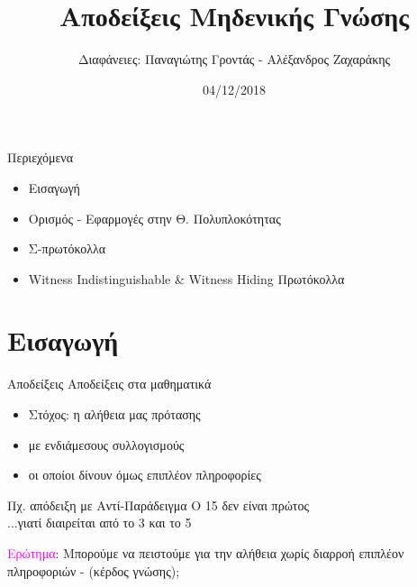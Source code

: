 \documentclass[10pt,handout]{beamer}
\title{Αποδείξεις Μηδενικής Γνώσης}
\author{Διαφάνειες: Παναγιώτης Γροντάς - Αλέξανδρος Ζαχαράκης}
\date{04/12/2018}
\institute{ΕΜΠ - Κρυπτογραφία (2018-2019)}
\begin{document}
\newcommand{\xor}{ \oplus }
\newcommand{\msg}{ \mathtt{M} }
\newcommand{\KEY}{ \mathtt{K} }
\newcommand{\CPH}{ \mathtt{C} }
\newcommand{\keygen}{\mathtt{KeyGen}}
\newcommand{\enc}{\mathtt{Encrypt}}
\newcommand{\dec}{\mathtt{Decrypt}}
\newcommand{\sign}{\mathtt{Sign}}
\newcommand{\verify}{\mathtt{Verify}}
\newcommand{\adv}{$\mathcal{A}$}
\newcommand{\Hash}{\mathcal{H} }
\newcommand{\advb}{$\mathcal{B}$}
\newcommand{\chal}{$\mathcal{C}$}
\newcommand{\cs}{$\mathcal{CS}$}
\newcommand{\Zed}{\mathbb{Z}} 
\newcommand{\zns}{\mathbb{Z}^*_n}
\newcommand{\zs}[1]{\mathbb{Z}^*_{#1}}
\newcommand{\prv}{\ensuremath \mathcal{P}\,}
\newcommand{\ver}{\ensuremath \mathcal{V}\,}
\newcommand{\siml}{$\mathcal{S}\,$}
\newcommand{\green}[1]{\textcolor{teal}{#1}}
\newcommand{\Green}[1]{\textcolor{Teal}{#1}}
\newcommand{\ForestGreen}[1]{\textcolor{ForestGreen}{#1}}
\newcommand{\blue}[1]{\textcolor{blue}{#1}}
\newcommand{\magenta}[1]{\textcolor{magenta}{#1}}
\newcommand{\cyan}[1]{\textcolor{cyan}{#1}}

\newcommand{\twopartdef}[4]
{ 
		\begin{cases}
			#1 , #2 \\
			#3 , #4
		\end{cases} 
}
\begin{frame}
\titlepage
\end{frame}

\begin{frame}{Περιεχόμενα}
\begin{itemize}
\item Εισαγωγή
\item Ορισμός - Εφαρμογές στην Θ. Πολυπλοκότητας
\item Σ-πρωτόκολλα
\item Witness Indistinguishable \& Witness Hiding Πρωτόκολλα
\end{itemize}
\end{frame}

\section{Εισαγωγή}
\begin{frame}{Αποδείξεις}
Αποδείξεις στα μαθηματικά
\pause
\begin{itemize}
\item Στόχος: η αλήθεια μας πρότασης
\pause
\item με ενδιάμεσους συλλογισμούς
\pause
\item οι οποίοι δίνουν όμως επιπλέον πληροφορίες
\pause
\end{itemize}
\begin{block}{Πχ. απόδειξη με Αντί-Παράδειγμα}
O 15 δεν είναι πρώτος \\
\pause
...γιατί διαιρείται από το 3 και το 5
\end{block}
\pause
\magenta{Ερώτημα}: Μπορούμε να πειστούμε για την αλήθεια χωρίς διαρροή επιπλέον πληροφοριών - (κέρδος γνώσης);
\end{frame}
\end{document}
